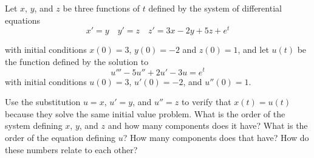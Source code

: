 \begin{exercise}\ansMark%
Let $x$, $y$, and $z$ be three functions of $t$ defined by the system of differential equations
\begin{equation*} 
x' = y \quad y' = z \quad z' = 3x - 2y + 5z + e^t
\end{equation*}

with initial conditions $x(0) = 3$, $y(0) = -2$ and $z(0) = 1$, and let $u(t)$ be the function defined by the solution to
\begin{equation*}
u''' - 5u'' + 2u' - 3u = e^t
\end{equation*}
with initial conditions $u(0) = 3$, $u'(0) = -2$, and $u''(0) = 1$. 
\begin{tasks}
\task Use the substitution $u=x$, $u' = y$, and $u'' = z$ to verify that $x(t) = u(t)$ because they solve the same initial value problem.
\task What is the order of the system defining $x$, $y$, and $z$ and how many components does it have?
\task What is the order of the equation defining $u$? How many components does that have?
\task How do these numbers relate to each other?
\end{tasks}
\end{exercise}

\setcounter{exercise}{100}







